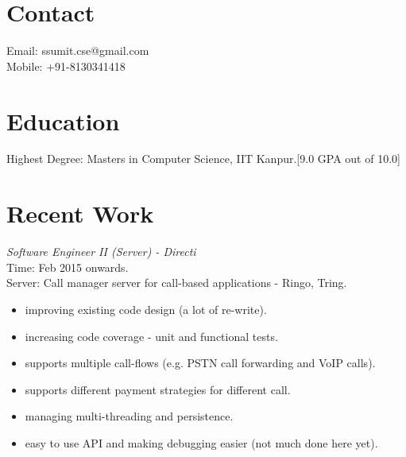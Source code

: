 \documentclass[margin,line]{resume}
\begin{document}
\begin{resume}

    \section{\mysidestyle Contact}
    	Email: ssumit.cse@gmail.com\\
    	Mobile: +91-8130341418
    \section{\mysidestyle Education}
	Highest Degree: Masters in Computer Science, IIT Kanpur.[9.0 GPA out of 10.0]

    \section{\mysidestyle Recent Work}

\textit{Software Engineer II (Server) - Directi} \\
Time: Feb 2015 onwards.\\
Server: Call manager server for call-based applications - Ringo, Tring.\\
\begin{itemize}
	\item improving existing code design (a lot of re-write).
	\item increasing code coverage - unit and functional tests.
	\item supports multiple call-flows (e.g. PSTN call forwarding and VoIP calls).
	\item supports different payment strategies for different call.
	\item managing multi-threading and persistence.
	\item easy to use API and making debugging easier (not much done here yet).
\end{itemize}


\end{resume}
\end{document}
